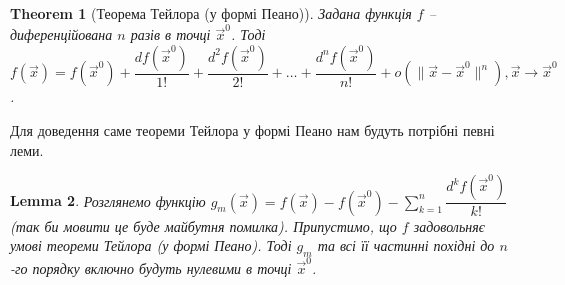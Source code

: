 \documentclass[a4paper, 10pt]{article}
\theoremstyle{theoremdd}
\newtheorem{theorem}{Theorem}[subsection]
\theoremstyle{theoremdd}
\theoremstyle{theoremdd}
\theoremstyle{theoremdd}
\theoremstyle{theoremdd}
\theoremstyle{theoremdd}
\theoremstyle{theoremdd}
\theoremstyle{theoremdd}
\newtheorem{lemma}[theorem]{Lemma}
\theoremstyle{theoremdd}
\newcommand\Norm[1]{\|#1\|}
\begin{document}

\begin{theorem}[Теорема Тейлора (у формі Пеано)]
Задана функція $f$ -- диференційована $n$ разів в точці $\vec{x}^0$. Тоді\\
$f(\vec{x}) = f(\vec{x}^0) + \dfrac{df(\vec{x}^0)}{1!} + \dfrac{d^2 f(\vec{x}^0)}{2!} + \dots  + \dfrac{d^{n} f(\vec{x}^0)}{n!} + o(\Norm{\vec{x}-\vec{x}^0}^n), \vec{x} \to \vec{x}^0$.
\end{theorem}

Для доведення саме теореми Тейлора у формі Пеано нам будуть потрібні певні леми.

\begin{lemma}
Розглянемо функцію $g_m(\vec{x}) = f(\vec{x}) - f(\vec{x}^0) - \displaystyle\sum_{k=1}^n \dfrac{d^k f(\vec{x}^0)}{k!}$ (так би мовити це буде майбутня помилка). Припустимо, що $f$ задовольняє умові теореми Тейлора (у формі Пеано). Тоді $g_m$ та всі її частинні похідні до $n$-го порядку включно будуть нулевими в точці $\vec{x}^0$.
\end{lemma}
\end{document}
